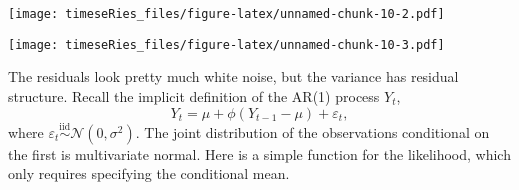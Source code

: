 \documentclass[]{book}
\newenvironment{Shaded}{\begin{snugshade}}{\end{snugshade}}
\newcommand{\CommentTok}[1]{\textcolor[rgb]{0.56,0.35,0.01}{\textit{#1}}}
\newcommand{\DataTypeTok}[1]{\textcolor[rgb]{0.13,0.29,0.53}{#1}}
\newcommand{\DecValTok}[1]{\textcolor[rgb]{0.00,0.00,0.81}{#1}}
\newcommand{\KeywordTok}[1]{\textcolor[rgb]{0.13,0.29,0.53}{\textbf{#1}}}
\newcommand{\NormalTok}[1]{#1}
\newcommand{\OperatorTok}[1]{\textcolor[rgb]{0.81,0.36,0.00}{\textbf{#1}}}
\newcommand{\StringTok}[1]{\textcolor[rgb]{0.31,0.60,0.02}{#1}}
\begin{document}
\texttt{[image: timeseRies\_files/figure-latex/unnamed-chunk-10-2.pdf]}

\begin{Shaded}
\end{Shaded}

\texttt{[image: timeseRies\_files/figure-latex/unnamed-chunk-10-3.pdf]}

The residuals look pretty much white noise, but the variance has
residual structure. Recall the implicit definition of the AR(1) process
\(Y_t\), \[Y_t=\mu+\phi(Y_{t-1}-\mu)+\varepsilon_t,\] where
\(\varepsilon_t \stackrel{\mathrm{iid}}{\sim} \mathcal{N}(0,\sigma^2)\).
The joint distribution of the observations conditional on the first is
multivariate normal. Here is a simple function for the likelihood, which
only requires specifying the conditional mean.
\end{document}
